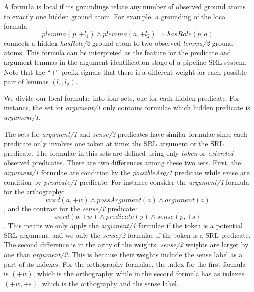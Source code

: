 
A formula is local if its groundings relate any number of observed ground atoms 
to exactly one hidden ground atom.  For example, a grounding of the local 
formula \[plemma(p,+l_1) \wedge plemma(a,+l_2) \Rightarrow hasRole(p,a)\]
connects a hidden \emph{hasRole/2} ground atom to two observed \emph{lemma/2} 
ground atoms. This formula can be interpreted as the feature for the predicate 
and argument lemmas in the argument identification stage of a pipeline SRL 
system.
Note that the ``+'' prefix signals that there is a different weight for each 
possible pair of lemmas $(l_1,l_2)$.

We divide our local formulae into four sets, one for each hidden predicate.  For 
instance, the set for \emph{argument/1} only contains formulae which hidden 
predicate is \emph{argument/1}. 

The sets for \emph{argument/1} and \emph{sense/2} predicates have similar 
formulae since each predicate only involves one token at time: the SRL argument 
or the SRL predicate. The formulae in this sets are defined using only 
\emph{token} or \emph{extended} observed predicates. There are two differences 
among these two sets.  First, the \emph{argument/1} formulae are condition by
the \emph{possibleArg/1} predicate while sense are condition by 
\emph{predicate/1} predicate. For instance consider the \emph{argument/1} 
formula for the orthography: \[word(a,+w) \land possArgument(a) \land 
argument(a)\], and the contrast for the \emph{sense/2} predicate: \[word(p,+w) 
\land predicate(p) \land sense(p,+s)\]. This means we only apply the 
\emph{argument/1} formulae if the token is a potential SRL argument, and we 
only the \emph{sense/2} formulae if the token is a SRL predicate. The second 
difference is in the arity of the weights. \emph{sense/2} weights are larger by 
one than \emph{argument/2}. This is because their weights include the sense 
label as a part of its indexes. For the orthography formulae, the index for the
first formula is $(+w)$, which is the orthography, while in the second formula 
has as indexes $(+w,+s)$, which is the orthography and the sense label.

